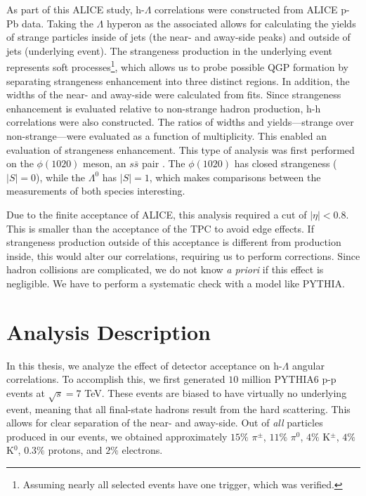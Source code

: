 \documentclass[../main.tex]{subfiles}
\begin{document}
As part of this ALICE study, h-$\Lambda$ correlations were constructed from ALICE p-Pb data. Taking the $\Lambda$ hyperon as the associated allows for calculating the yields of strange particles inside of jets (the near- and away-side peaks) and outside of jets (underlying event). The strangeness production in the underlying event represents soft processes\footnote{Assuming nearly all selected events have one trigger, which was verified.}, which allows us to probe possible QGP formation by separating strangeness enhancement into three distinct regions. In addition, the widths of the near- and away-side were calculated from fits. Since strangeness enhancement is evaluated relative to non-strange hadron production, h-h correlations were also constructed. The ratios of widths and yields---strange over non-strange---were evaluated as a function of multiplicity. This enabled an evaluation of strangeness enhancement. This type of analysis was first performed on the $\phi(1020)$ meson, an $s\bar{s}$ pair \cite{Blair:2023rli}. The $\phi(1020)$ has closed strangeness ($|S|=0$), while the $\Lambda^0$ has $|S|=1$, which makes comparisons between the measurements of both species interesting. 

Due to the finite acceptance of ALICE, this analysis required a cut of $|\eta| < 0.8$. This is smaller than the acceptance of the TPC to avoid edge effects. If strangeness production outside of this acceptance is different from production inside, this would alter our correlations, requiring us to perform corrections. Since hadron collisions are complicated, we do not know \textit{a priori} if this effect is negligible. We have to perform a systematic check with a model like PYTHIA. 

\section{Analysis Description}
In this thesis, we analyze the effect of detector acceptance on h-$\Lambda$ angular correlations. To accomplish this, we first generated $10$ million PYTHIA6 p-p events at $\sqrt{s}=7$ TeV. These events are biased to have virtually no underlying event, meaning that all final-state hadrons result from the hard scattering. This allows for clear separation of the near- and away-side. Out of \textit{all} particles produced in our events, we obtained approximately $15\%$ $\pi^{\pm}$, $11\%$ $\pi^0$, $4\%$ K$^{\pm}$, $4\%$ K$^{0}$, $0.3\%$ protons, and $2\%$ electrons.  
\end{document}
